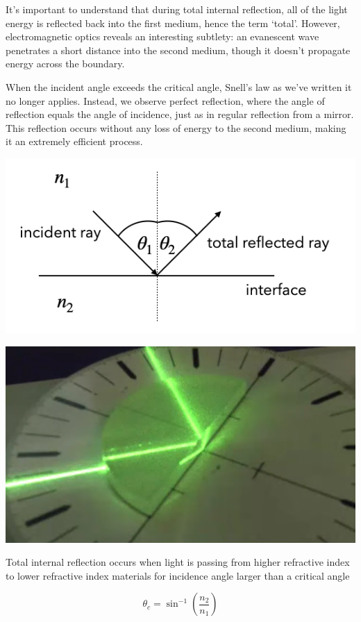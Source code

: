 \documentclass[
  a4paper,
]{book}
\begin{document}
It's important to understand that during total internal reflection, all
of the light energy is reflected back into the first medium, hence the
term `total'. However, electromagnetic optics reveals an interesting
subtlety: an evanescent wave penetrates a short distance into the second
medium, though it doesn't propagate energy across the boundary.

When the incident angle exceeds the critical angle, Snell's law as we've
written it no longer applies. Instead, we observe perfect reflection,
where the angle of reflection equals the angle of incidence, just as in
regular reflection from a mirror. This reflection occurs without any
loss of energy to the second medium, making it an extremely efficient
process.

\includegraphics[width=0.5\linewidth,height=\textheight,keepaspectratio]{geometrical-optics/../assets/images/reflection/tir.png}
\begin{center}
\includegraphics[width=0.49\linewidth,height=\textheight,keepaspectratio]{geometrical-optics/../assets/images/reflection/tir_disk.png}
\end{center}

\begin{tcolorbox}[enhanced jigsaw, coltitle=black, title=\textcolor{quarto-callout-tip-color}{\faLightbulb}\hspace{0.5em}{Total Internal Reflection}, colframe=quarto-callout-tip-color-frame, toprule=.15mm, opacitybacktitle=0.6, left=2mm, opacityback=0, breakable, toptitle=1mm, bottomtitle=1mm, leftrule=.75mm, arc=.35mm, titlerule=0mm, colbacktitle=quarto-callout-tip-color!10!white, rightrule=.15mm, bottomrule=.15mm, colback=white]

Total internal reflection occurs when light is passing from higher
refractive index to lower refractive index materials for incidence angle
larger than a critical angle

\[
\theta_c=\sin^{-1}\left (\frac{n_2}{n_1}\right )
\]

\end{tcolorbox}
\end{document}
